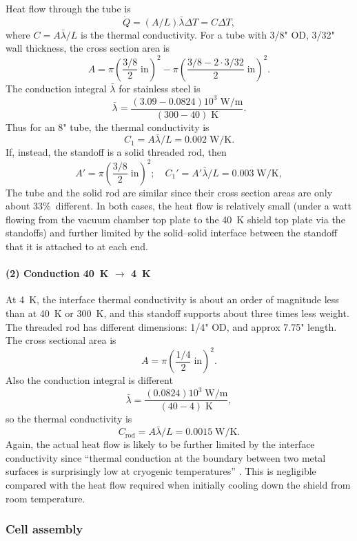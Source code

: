 Heat flow through the tube is \cite[eqn~2.2]{ekin2006experimental}
%
\[
   \dot Q=(A/L)\bar\lambda\Delta T=C\Delta T,
\]
where $C=A\bar\lambda/L$ is the thermal conductivity. For a tube with 3/8"
OD, 3/32" wall thickness, the cross section area is
%
\[
   A=\pi\left(\frac{3/8}{2}\;\text{in}\right)^2-\pi\left(\frac{3/8-2\cdot3/32}{2}\;\text{in}\right)^2.
\]
%
The conduction integral $\bar\lambda$ for stainless steel
\cite[Appendix~2.1]{ekin2006experimental} is
%
\[
   \bar\lambda=\frac{(3.09-0.0824)10^3\;\text{W/m}}{(300-40)\;\text{K}}.
\]
%
Thus for an 8" tube, the thermal conductivity is
%
\[
   C_1=A\bar\lambda/L=0.002\;\text{W/K}.
\]
%
If, instead, the standoff is a solid threaded rod, then
%
\[
   A'=\pi\left(\frac{3/8}{2}\;\text{in}\right)^2;
   \quad
   C_1'=A'\bar\lambda/L=0.003\;\text{W/K},
\]
%
The tube and the solid rod are similar since their cross section areas are only
about 33\%\ different.  In both cases, the heat flow is relatively small (under
a watt flowing from the vacuum chamber top plate to the 40~K shield top plate
via the standoffs) and further limited by the solid--solid interface between
the standoff that it is attached to at each end.

\paragraph{(2) Conduction 40~K $\rightarrow$ 4~K}

At 4~K, the interface thermal conductivity is about an order of magnitude less
than at 40~K or 300~K, and this standoff supports about three times less weight. The
threaded rod has different dimensions: 1/4" OD, and approx 7.75" length. The
cross sectional area is
%
\[
   A=\pi\left(\frac{1/4}{2}\;\text{in}\right)^2.
\]
%
Also the conduction integral is different
%
\[
   \bar\lambda=\frac{(0.0824)10^3\;\text{W/m}}{(40-4)\;\text{K}},
\]
%
so the thermal conductivity is
%
\[
   C_\text{rod}=A\bar\lambda/L=0.0015\;\text{W/K}.
\]
%
Again, the actual heat flow is likely to be further limited by the interface
conductivity since ``thermal conduction at the boundary between two metal
surfaces is surprisingly low at cryogenic temperatures''
\cite[sect~2.6]{ekin2006experimental}. This is negligible compared with the heat
flow required when initially cooling down the shield from room temperature.

\subsubsection{Cell assembly}


